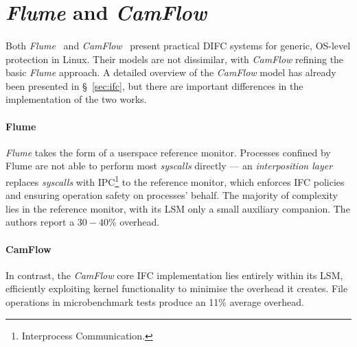 

\section{\textit{Flume} and \textit{CamFlow}}

\paragraph{} Both \textit{Flume}~\cite{flume} and \textit{CamFlow}~\cite{camflow} present practical DIFC systems for generic, OS-level protection in Linux. Their models are not dissimilar, with \textit{CamFlow} refining the basic \textit{Flume} approach. A detailed overview of the \textit{CamFlow} model has already been presented in §~\ref{sec:ifc}, but there are important differences in the implementation of the two works.

\paragraph{Flume} \textit{Flume} takes the form of a userspace reference monitor. Processes confined by Flume are not able to perform most \textit{syscalls} directly --- an \textit{interposition layer} replaces \textit{syscalls} with IPC\footnote{Interprocess Communication.} to the reference monitor, which enforces IFC policies and ensuring operation safety on processes' behalf. The majority of complexity lies in the reference monitor, with its LSM only a small auxiliary companion. The authors report a $30-40$\% overhead.

\paragraph{CamFlow} In contrast, the \textit{CamFlow} core IFC implementation lies entirely within its LSM, efficiently exploiting kernel functionality to minimise the overhead it creates. File operations in microbenchmark tests produce an 11\% average overhead.


